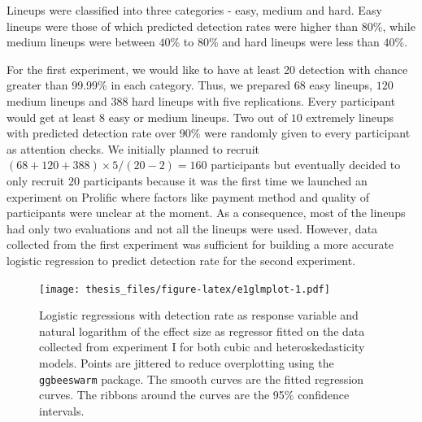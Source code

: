 \documentclass{monashthesis}
\theoremstyle{definition}
\theoremstyle{definition}
\theoremstyle{definition}
\theoremstyle{definition}
\theoremstyle{remark}
\begin{document}
Lineups were classified into three categories - easy, medium and hard. Easy lineups were those of which predicted detection rates were higher than \(80\)\%, while medium lineups were between \(40\)\% to \(80\)\% and hard lineups were less than \(40\)\%.

For the first experiment, we would like to have at least 20 detection with chance greater than 99.99\% in each category. Thus, we prepared \(68\) easy lineups, \(120\) medium lineups and \(388\) hard lineups with five replications. Every participant would get at least \(8\) easy or medium lineups. Two out of \(10\) extremely lineups with predicted detection rate over \(90\)\% were randomly given to every participant as attention checks. We initially planned to recruit \((68+120+388) \times 5 / (20-2) = 160\) participants but eventually decided to only recruit \(20\) participants because it was the first time we launched an experiment on Prolific where factors like payment method and quality of participants were unclear at the moment. As a consequence, most of the lineups had only two evaluations and not all the lineups were used. However, data collected from the first experiment was sufficient for building a more accurate logistic regression to predict detection rate for the second experiment.

\begin{figure}
\centering
\texttt{[image: thesis\_files/figure-latex/e1glmplot-1.pdf]}
\caption{\label{fig:e1glmplot}Logistic regressions with detection rate as response variable and natural logarithm of the effect size as regressor fitted on the data collected from experiment I for both cubic and heteroskedasticity models. Points are jittered to reduce overplotting using the \texttt{ggbeeswarm} package. The smooth curves are the fitted regression curves. The ribbons around the curves are the 95\% confidence intervals.}
\end{figure}
\end{document}
